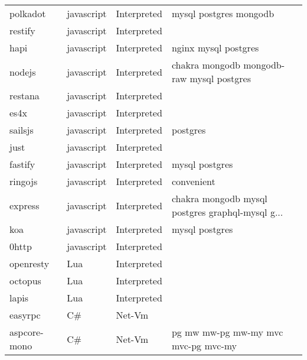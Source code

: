 \begin{longtable}{llll}
    polkadot         & javascript & Interpreted  & mysql postgres mongodb                             \\
    restify          & javascript & Interpreted  &                                                    \\
    hapi             & javascript & Interpreted  & nginx mysql postgres                               \\
    nodejs           & javascript & Interpreted  & chakra mongodb mongodb-raw mysql postgres          \\
    restana          & javascript & Interpreted  &                                                    \\
    es4x             & javascript & Interpreted  &                                                    \\
    sailsjs          & javascript & Interpreted  & postgres                                           \\
    just             & javascript & Interpreted  &                                                    \\
    fastify          & javascript & Interpreted  & mysql postgres                                     \\
    ringojs          & javascript & Interpreted  & convenient                                         \\
    express          & javascript & Interpreted  & chakra mongodb mysql postgres graphql-mysql g...   \\
    koa              & javascript & Interpreted  & mysql postgres                                     \\
    0http            & javascript & Interpreted  &                                                    \\
    openresty        & Lua & Interpreted         &                                                    \\
    octopus          & Lua & Interpreted         &                                                    \\
    lapis            & Lua & Interpreted         &                                                    \\
    easyrpc          & C\# & Net-Vm         &                                                    \\
    aspcore-mono     & C\# & Net-Vm         & pg mw mw-pg mw-my mvc mvc-pg mvc-my                \\

\end{longtable}
